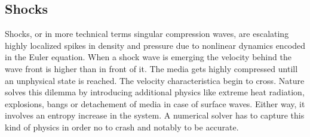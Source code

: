 \subsection{Shocks}

Shocks, or in more technical terms singular compression waves, are escalating
highly localized spikes in density and pressure due to nonlinear dynamics
encoded in the Euler equation. When a shock wave is emerging the velocity
behind the wave front is higher than in front of it. The media gets highly
compressed untill an unphysical state is reached. The velocity characteristica
begin to cross. Nature solves this dilemma by introducing additional physics
like extreme heat radiation, explosions, bangs or detachement of media in case
of surface waves. Either way, it involves an entropy increase in the system.
A numerical solver has to capture this kind of physics in order no to crash and
notably to be accurate.
